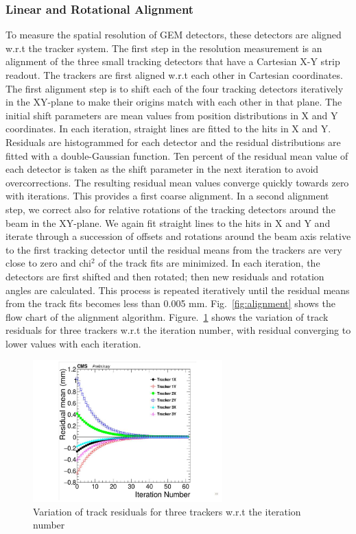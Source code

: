 \subsubsection{Linear and Rotational Alignment}
To measure the spatial resolution of GEM detectors, these detectors are aligned w.r.t the tracker system.
The first step in the resolution measurement is an alignment of the three small tracking detectors that have a Cartesian X-Y strip readout.
The trackers are first aligned w.r.t each other in Cartesian coordinates.
The first alignment step is to shift each of the four tracking detectors iteratively in the XY-plane to make their origins match with each other in that plane.
The initial shift parameters are mean values from position distributions in X and Y coordinates. In each iteration, straight lines are fitted to the hits in X and Y.
Residuals are histogrammed for each detector and the residual distributions are fitted with a double-Gaussian function.
Ten percent of the residual mean value of each detector is taken as the shift parameter in the next iteration to avoid overcorrections.
The resulting residual mean values converge quickly towards zero with iterations.
This provides a first coarse alignment.
In a second alignment step, we correct also for relative rotations of the tracking detectors around the beam in the XY-plane.
We again fit straight lines to the hits in X and Y and iterate through a succession of offsets and rotations around the beam axis relative to the first tracking detector until the residual means from the trackers are very close to zero and chi$^2$ of the track fits are minimized.
In each iteration, the detectors are first shifted and then rotated; then new residuals and rotation angles are calculated.
This process is repeated iteratively until the residual means from the track fits becomes less than 0.005 mm. Fig.~\ref{fig:alignment} shows the flow chart of the alignment algorithm.
Figure.~\ref{fig:alignmentIteration} shows the variation of track residuals for three trackers w.r.t the iteration number, with residual converging to lower values with each iteration.
\begin{figure}[!htbp]
\centering
\includegraphics[width=0.65\textwidth]{figures/GEM/Tracker_iterative_alignment.jpg}
\caption{Variation of track residuals for three trackers  w.r.t the iteration number}\label{fig:alignmentIteration}
\end{figure}

